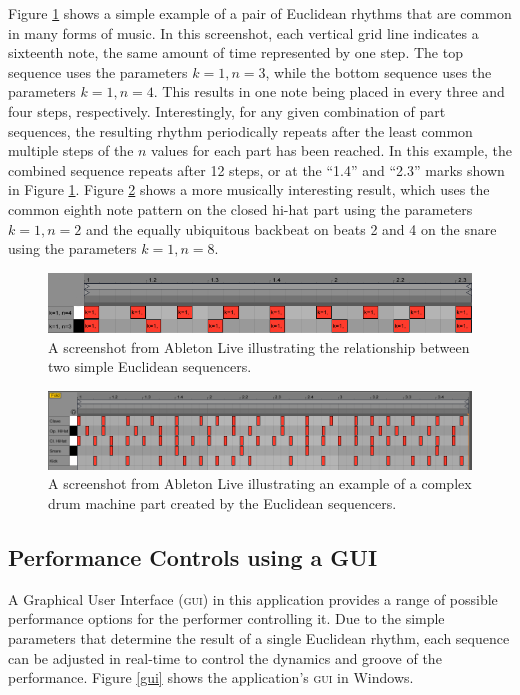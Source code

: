 \documentclass{sig-alternate-05-2015}
\begin{document}
Figure \ref{3-on-4} shows a simple example of a pair of Euclidean rhythms that are common in many forms of music. In this screenshot, each vertical grid line indicates a sixteenth note, the same amount of time represented by one step. The top sequence uses the parameters $k=1, n=3$, while the bottom sequence uses the parameters $k=1, n=4$. This results in one note being placed in every three and four steps, respectively. Interestingly, for any given combination of part sequences, the resulting rhythm periodically repeats after the least common multiple steps of the $n$ values for each part has been reached. In this example, the combined sequence repeats after 12 steps, or at the ``1.4'' and ``2.3'' marks shown in Figure \ref{3-on-4}. Figure \ref{complex} shows a more musically interesting result, which uses the common eighth note pattern on the closed hi-hat part using the parameters $k=1, n=2$ and the equally ubiquitous backbeat on beats 2 and 4 on the snare using the parameters $k=1, n=8$. 

\begin{figure}
\centering
\includegraphics[width=0.9\linewidth]{figs/3-on-4.png}
\caption{A screenshot from Ableton Live illustrating the relationship between two simple Euclidean sequencers.}
\label{3-on-4}
\end{figure}

\begin{figure}
\centering
\includegraphics[width=0.9\linewidth]{figs/complex-rhythm.png}
\caption{A screenshot from Ableton Live illustrating an example of a complex drum machine part created by the Euclidean sequencers.}
\label{complex}
\end{figure}

\subsection{Performance Controls using a GUI}

A Graphical User Interface (\textsc{gui}) in this application provides a range of possible performance options for the performer controlling it. Due to the simple parameters that determine the result of a single Euclidean rhythm, each sequence can be adjusted in real-time to control the dynamics and groove of the performance. Figure \ref{gui} shows the application's \textsc{gui} in Windows.
\end{document}
